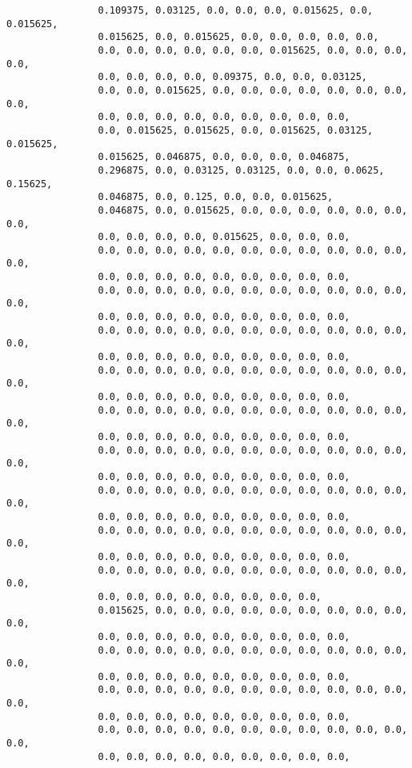 \begin{verbatim}
                0.109375, 0.03125, 0.0, 0.0, 0.0, 0.015625, 0.0, 0.015625,
                0.015625, 0.0, 0.015625, 0.0, 0.0, 0.0, 0.0, 0.0,
                0.0, 0.0, 0.0, 0.0, 0.0, 0.0, 0.015625, 0.0, 0.0, 0.0, 0.0,
                0.0, 0.0, 0.0, 0.0, 0.09375, 0.0, 0.0, 0.03125,
                0.0, 0.0, 0.015625, 0.0, 0.0, 0.0, 0.0, 0.0, 0.0, 0.0, 0.0,
                0.0, 0.0, 0.0, 0.0, 0.0, 0.0, 0.0, 0.0, 0.0,
                0.0, 0.015625, 0.015625, 0.0, 0.015625, 0.03125, 0.015625,
                0.015625, 0.046875, 0.0, 0.0, 0.0, 0.046875,
                0.296875, 0.0, 0.03125, 0.03125, 0.0, 0.0, 0.0625, 0.15625,
                0.046875, 0.0, 0.125, 0.0, 0.0, 0.015625,
                0.046875, 0.0, 0.015625, 0.0, 0.0, 0.0, 0.0, 0.0, 0.0, 0.0,
                0.0, 0.0, 0.0, 0.0, 0.015625, 0.0, 0.0, 0.0,
                0.0, 0.0, 0.0, 0.0, 0.0, 0.0, 0.0, 0.0, 0.0, 0.0, 0.0, 0.0,
                0.0, 0.0, 0.0, 0.0, 0.0, 0.0, 0.0, 0.0, 0.0,
                0.0, 0.0, 0.0, 0.0, 0.0, 0.0, 0.0, 0.0, 0.0, 0.0, 0.0, 0.0,
                0.0, 0.0, 0.0, 0.0, 0.0, 0.0, 0.0, 0.0, 0.0,
                0.0, 0.0, 0.0, 0.0, 0.0, 0.0, 0.0, 0.0, 0.0, 0.0, 0.0, 0.0,
                0.0, 0.0, 0.0, 0.0, 0.0, 0.0, 0.0, 0.0, 0.0,
                0.0, 0.0, 0.0, 0.0, 0.0, 0.0, 0.0, 0.0, 0.0, 0.0, 0.0, 0.0,
                0.0, 0.0, 0.0, 0.0, 0.0, 0.0, 0.0, 0.0, 0.0,
                0.0, 0.0, 0.0, 0.0, 0.0, 0.0, 0.0, 0.0, 0.0, 0.0, 0.0, 0.0,
                0.0, 0.0, 0.0, 0.0, 0.0, 0.0, 0.0, 0.0, 0.0,
                0.0, 0.0, 0.0, 0.0, 0.0, 0.0, 0.0, 0.0, 0.0, 0.0, 0.0, 0.0,
                0.0, 0.0, 0.0, 0.0, 0.0, 0.0, 0.0, 0.0, 0.0,
                0.0, 0.0, 0.0, 0.0, 0.0, 0.0, 0.0, 0.0, 0.0, 0.0, 0.0, 0.0,
                0.0, 0.0, 0.0, 0.0, 0.0, 0.0, 0.0, 0.0, 0.0,
                0.0, 0.0, 0.0, 0.0, 0.0, 0.0, 0.0, 0.0, 0.0, 0.0, 0.0, 0.0,
                0.0, 0.0, 0.0, 0.0, 0.0, 0.0, 0.0, 0.0, 0.0,
                0.0, 0.0, 0.0, 0.0, 0.0, 0.0, 0.0, 0.0, 0.0, 0.0, 0.0, 0.0,
                0.0, 0.0, 0.0, 0.0, 0.0, 0.0, 0.0, 0.0,
                0.015625, 0.0, 0.0, 0.0, 0.0, 0.0, 0.0, 0.0, 0.0, 0.0, 0.0,
                0.0, 0.0, 0.0, 0.0, 0.0, 0.0, 0.0, 0.0, 0.0,
                0.0, 0.0, 0.0, 0.0, 0.0, 0.0, 0.0, 0.0, 0.0, 0.0, 0.0, 0.0,
                0.0, 0.0, 0.0, 0.0, 0.0, 0.0, 0.0, 0.0, 0.0,
                0.0, 0.0, 0.0, 0.0, 0.0, 0.0, 0.0, 0.0, 0.0, 0.0, 0.0, 0.0,
                0.0, 0.0, 0.0, 0.0, 0.0, 0.0, 0.0, 0.0, 0.0,
                0.0, 0.0, 0.0, 0.0, 0.0, 0.0, 0.0, 0.0, 0.0, 0.0, 0.0, 0.0,
                0.0, 0.0, 0.0, 0.0, 0.0, 0.0, 0.0, 0.0, 0.0,

\end{verbatim}
